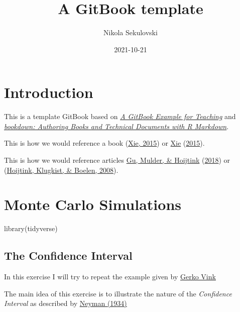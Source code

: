 \documentclass[
]{book}
\title{A GitBook template}
\author{Nikola Sekulovski}
\date{2021-10-21}
\newenvironment{Shaded}{\begin{snugshade}}{\end{snugshade}}
\newcommand{\FunctionTok}[1]{\textcolor[rgb]{0.00,0.00,0.00}{#1}}
\newcommand{\NormalTok}[1]{#1}
\begin{document}
\maketitle

{
\setcounter{tocdepth}{1}
\tableofcontents
}
\hypertarget{introduction}{%
\chapter{Introduction}\label{introduction}}

This is a template GitBook based on \href{https://cjvanlissa.github.io/gitbook-demo/}{\emph{A GitBook Example for Teaching}} and \href{https://bookdown.org/yihui/bookdown/}{\emph{bookdown: Authoring Books and Technical Documents with R Markdown}}.

This is how we would reference a book (\protect\hyperlink{ref-xie2015}{Xie, 2015}) or \protect\hyperlink{ref-xie2015}{Xie} (\protect\hyperlink{ref-xie2015}{2015}).

This is how we would reference articles \protect\hyperlink{ref-gu2018approximated}{Gu, Mulder, \& Hoijtink} (\protect\hyperlink{ref-gu2018approximated}{2018}) or (\protect\hyperlink{ref-hoijtink2008bayesian}{Hoijtink, Klugkist, \& Boelen, 2008}).

\hypertarget{monte-carlo-simulations}{%
\chapter{Monte Carlo Simulations}\label{monte-carlo-simulations}}

\begin{Shaded}
\begin{Highlighting}[]
\FunctionTok{library}\NormalTok{(tidyverse)}
\end{Highlighting}
\end{Shaded}

\hypertarget{the-confidence-interval}{%
\section{The Confidence Interval}\label{the-confidence-interval}}

In this exercise I will try to repeat the example given by \href{https://www.gerkovink.com/markup/Wk1/Solution_to_Ex1.html}{Gerko Vink}

The main idea of this exercise is to illustrate the nature of the \emph{Confidence Interval} as described by \href{http://www.stat.cmu.edu/~brian/905-2008/papers/neyman-1934-jrss.pdf}{Neyman (1934)}
\end{document}
